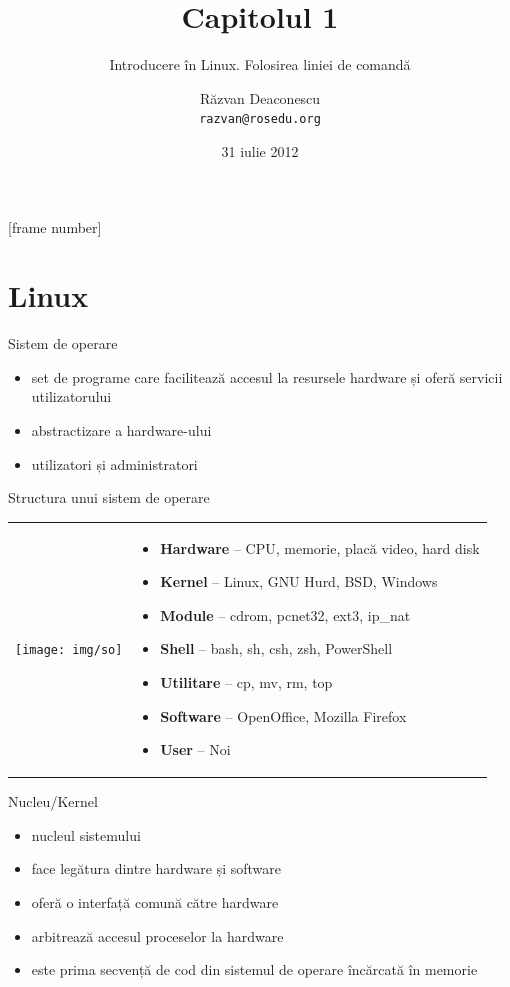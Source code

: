 \documentclass[handout]{beamer}
\title[Capitolul 1]{Capitolul 1}
\subtitle{Introducere în Linux. Folosirea liniei de comandă}
\author{Răzvan Deaconescu \\
   \texttt{razvan@rosedu.org}}
\date{31 iulie 2012}
\begin{document}
[frame number]

\frame{\titlepage}

\section{Linux}

\begin{frame}{Sistem de operare}
  \begin{itemize}
    \item set de programe care facilitează accesul la resursele hardware și
      oferă servicii utilizatorului
    \item abstractizare a hardware-ului
    \item utilizatori și administratori
  \end{itemize}
\end{frame}

\begin{frame}{Structura unui sistem de operare}
  \begin{tabular}{m{}m{}}
    \texttt{[image: img/so]}
    &
    \begin{itemize}
      \item \textbf{Hardware} -- CPU, memorie, placă video, hard disk
      \item \textbf{Kernel} -- Linux, GNU Hurd, BSD, Windows
      \item \textbf{Module} -- cdrom, pcnet32, ext3, ip\_nat
      \item \textbf{Shell} -- bash, sh, csh, zsh, PowerShell
      \item \textbf{Utilitare} -- cp, mv, rm, top
      \item \textbf{Software} -- OpenOffice, Mozilla Firefox
      \item \textbf{User} -- Noi
    \end{itemize}
  \end{tabular}
\end{frame}

\begin{frame}{Nucleu/Kernel}
  \begin{itemize}
    \item<1-> nucleul sistemului
    \item<2-> face legătura dintre hardware și software
    \item<3-> oferă o interfață comună către hardware
    \item<4-> arbitrează accesul proceselor la hardware
    \item<5-> este prima secvență de cod din sistemul de operare încărcată în
      memorie
  \end{itemize}
\end{frame}
\end{document}
